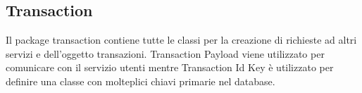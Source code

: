 \subsection{Transaction}
Il package transaction contiene tutte le classi per la creazione di richieste ad altri servizi e dell'oggetto transazioni. Transaction Payload viene utilizzato per comunicare con il servizio utenti mentre Transaction Id Key è utilizzato per definire una classe con molteplici chiavi primarie nel database.